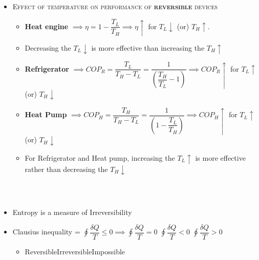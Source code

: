 \documentclass[8pt]{article}
\begin{document}
		\begin{itemize}
			\item \textsc{Effect of temperature on performance of \textbf{reversible} devices}
				\begin{itemize}
					\item \textbf{Heat engine} $\implies\boxed{\eta = 1-\dfrac{T_L}{T_H}} \implies \eta \uparrow$ for $T_L\downarrow$ (or) $T_H\uparrow$. 
					\item Decreasing the $T_L\downarrow$ is more effective than increasing the $T_H\uparrow$
					\item \textbf{Refrigerator} $\implies\boxed{COP_R=\dfrac{T_L}{T_H-T_L} = \dfrac{1}{\left(\dfrac{T_H}{T_L}-1\right)}} \implies COP_R \uparrow$ for $T_L\uparrow$ (or) $T_H\downarrow$
					\item \textbf{Heat Pump} $\implies\boxed{COP_H=\dfrac{T_H}{T_H-T_L} = \dfrac{1}{\left(1-\dfrac{T_L}{T_H}\right)}} \implies COP_H \uparrow$ for $T_L\uparrow$ (or) $T_H\downarrow$
					\item For Refrigerator and Heat pump, increasing the $T_L\uparrow$ is more effective rather than decreasing the $T_H\downarrow$	
				\end{itemize}
	\end{itemize}\hrulefill
\begin{center}
\subsection*{}
\end{center}
\\
	\begin{itemize}
		\item Entropy is a measure of Irreversibility
		\item Clausius inequality = $\boxed{\oint \dfrac{\delta Q}{T}\le 0} \implies \boxed{\oint \dfrac{\delta Q}{T} = 0}$ \hspace{0.5cm} $\boxed{\oint \dfrac{\delta Q}{T} < 0}$ \hspace{0.5cm} $\boxed{\oint \dfrac{\delta Q}{T} > 0}$ 
			\begin{itemize}
				\item[] \hspace{5.5cm}Reversible\hspace{1cm}Irreversible\hspace{1cm}Impossible
			\end{itemize}
	\end{itemize}
\end{document}
